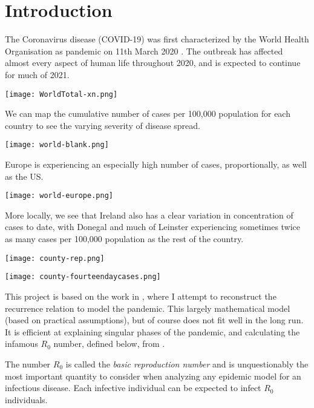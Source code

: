 \section{Introduction}
\label{ch:intro}

The Coronavirus disease (COVID-19) was first characterized by the World Health Organisation as pandemic on 11th March 2020 \cite{whodeclare20}. The outbreak has affected almost every aspect of human life throughout 2020, and is expected to continue for much of 2021. 

\texttt{[image: WorldTotal-xn.png]}

We can map the cumulative number of cases per 100,000 population for each country to see the varying severity of disease spread. 

\texttt{[image: world-blank.png]}

Europe is experiencing an especially high number of cases, proportionally, as well as the US.

\texttt{[image: world-europe.png]}

More locally, we see that Ireland also has a clear variation in concentration of cases to date, with Donegal and much of Leinster experiencing sometimes twice as many cases per 100,000 population as the rest of the country.

\texttt{[image: county-rep.png]}

\texttt{[image: county-fourteendaycases.png]}


This project is based on the work in \cite{grigor20}, where I attempt to  reconstruct the recurrence relation to model the pandemic. This largely mathematical model (based on practical assumptions), but of course does not fit well in the long run. It is efficient at explaining singular phases of the pandemic, and calculating the infamous $R_0$ number, defined below, from \cite{epid08}. 

\begin{ndefinition} 
The number $R_0$ is called
the \textit{basic reproduction number} and is unquestionably the most important quantity to consider when analyzing any epidemic model for an infectious disease. Each infective individual can be expected to infect $R_0$ individuals. 
\end{ndefinition}

